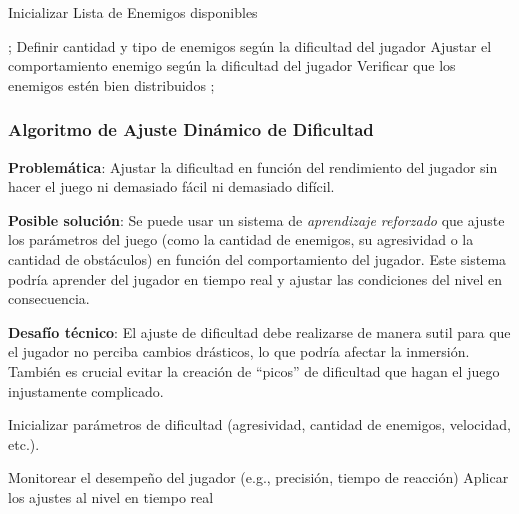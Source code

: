 \begin{algorithm}
\caption{Inicializar Lista de Enemigos disponibles};
\SetAlgoLined
Definir cantidad y tipo de enemigos según la dificultad del jugador\;
Ajustar el comportamiento enemigo según la dificultad del jugador\;
Verificar que los enemigos estén bien distribuidos\;
;
\end{algorithm}
\subsubsection*{Algoritmo de Ajuste Dinámico de Dificultad}

\textbf{Problemática}: Ajustar la dificultad en función del rendimiento del jugador sin hacer el juego ni demasiado fácil ni demasiado difícil.

\textbf{Posible solución}: Se puede usar un sistema de \textit{aprendizaje reforzado} que ajuste los parámetros del juego (como la cantidad de enemigos, su agresividad o la cantidad de obstáculos) en función del comportamiento del jugador. Este sistema podría aprender del jugador en tiempo real y ajustar las condiciones del nivel en consecuencia.

\textbf{Desafío técnico}: El ajuste de dificultad debe realizarse de manera sutil para que el jugador no perciba cambios drásticos, lo que podría afectar la inmersión. También es crucial evitar la creación de “picos” de dificultad que hagan el juego injustamente complicado.

\begin{algorithm}
\caption{Inicializar parámetros de dificultad (agresividad, cantidad de enemigos, velocidad, etc.).}
\SetAlgoLined
Monitorear el desempeño del jugador (e.g., precisión, tiempo de reacción)\;
Aplicar los ajustes al nivel en tiempo real\;
\;
\end{algorithm}

